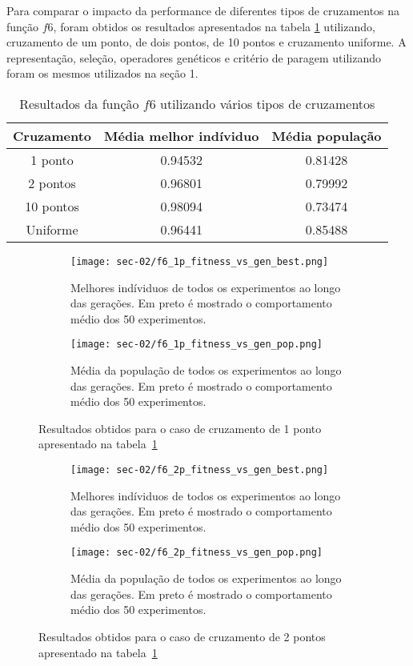 Para comparar o impacto da performance de diferentes tipos de cruzamentos na função $f6$,
foram obtidos os resultados apresentados na tabela \ref{tab:f6_crux} utilizando, cruzamento de um ponto,
de dois pontos, de 10 pontos e cruzamento uniforme. A representação, seleção, operadores genéticos
e critério de paragem utilizando foram os mesmos utilizados na seção 1.

\begin{table}[htb]
	\centering
	\begin{tabular}{|c|c|c|}
		\hline
		\rowcolor[HTML]{9B9B9B}
		Cruzamento & Média melhor indíviduo & Média população \\\hline
		1 ponto & 0.94532 & 0.81428 \\\hline
		2 pontos & 0.96801 & 0.79992 \\\hline
		10 pontos & 0.98094 & 0.73474 \\\hline
		Uniforme & 0.96441 & 0.85488 \\\hline
	\end{tabular}
	\caption{Resultados da função $f6$ utilizando vários tipos de cruzamentos \label{tab:f6_crux}}
\end{table}



\begin{figure}[htb]
	\begin{subfigure}{.45\textwidth}
		\centering
		\texttt{[image: sec-02/f6\_1p\_fitness\_vs\_gen\_best.png]}
		\caption{Melhores indíviduos de todos os experimentos ao longo das gerações.
		Em preto é mostrado o comportamento médio dos 50 experimentos. }
	\end{subfigure}
	\hfill
	\begin{subfigure}{.45\textwidth}
		\centering
		\texttt{[image: sec-02/f6\_1p\_fitness\_vs\_gen\_pop.png]}
		\caption{Média da população de todos os experimentos ao longo das gerações.
		Em preto é mostrado o comportamento médio dos 50 experimentos.}
	\end{subfigure}
	\caption{Resultados obtidos para o caso de cruzamento de 1 ponto apresentado na tabela~\ref{tab:f6_crux}}
\end{figure}


	\begin{figure}[htb]
	\begin{subfigure}{.45\textwidth}
		\centering
		\texttt{[image: sec-02/f6\_2p\_fitness\_vs\_gen\_best.png]}
		\caption{Melhores indíviduos de todos os experimentos ao longo das gerações.
		Em preto é mostrado o comportamento médio dos 50 experimentos. }
	\end{subfigure}
	\hfill
	\begin{subfigure}{.45\textwidth}
		\centering
		\texttt{[image: sec-02/f6\_2p\_fitness\_vs\_gen\_pop.png]}
		\caption{Média da população de todos os experimentos ao longo das gerações.
		Em preto é mostrado o comportamento médio dos 50 experimentos.}
	\end{subfigure}
	\caption{Resultados obtidos para o caso de cruzamento de 2 pontos apresentado na tabela~\ref{tab:f6_crux}}
\end{figure}



